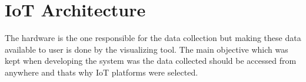 \section{IoT Architecture}

The hardware is the one responsible for the data collection but making these data available to user is done by the visualizing tool. The main objective which was kept when developing the system was the data collected should be accessed from anywhere and thats why IoT platforms were selected.

